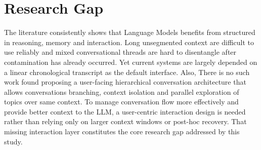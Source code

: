 \section{Research Gap}\label{subsec:gap}




The literature consistently shows that Language Models benefits from structured in reasoning, memory and interaction. Long unsegmented context are difficult to use reliably and mixed conversational threads are hard to disentangle after contamination has already occurred. Yet current systems are largely depended on a linear chronological transcript as the default interface. Also, There is no such work found proposing a user-facing hierarchical conversation architecture that allows conversations branching, context isolation and parallel exploration of topics over same context. To manage conversation flow more effectively and provide better context to the LLM, a user-centric interaction design is needed rather than relying only on larger context windows or post-hoc recovery. That missing interaction layer constitutes the core research gap addressed by this study.

